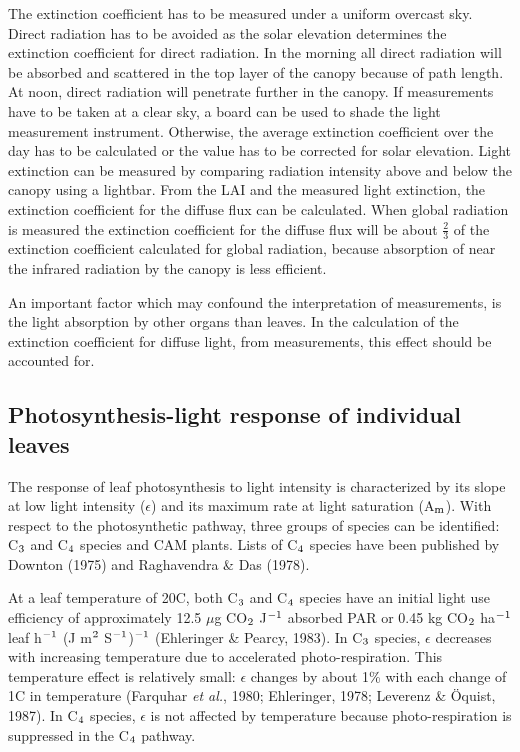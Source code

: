 The extinction coefficient has to be measured under a uniform overcast sky. Direct
radiation has to be avoided as the solar elevation determines the extinction coefficient for
direct radiation. In the morning all direct radiation will be absorbed and scattered in the
top layer of the canopy because of path length. At noon, direct radiation will penetrate
further in the canopy. If measurements have to be taken at a clear sky, a board can be
used to shade the light measurement instrument. Otherwise, the average extinction
coefficient over the day has to be calculated or the value has to be corrected for solar
elevation. Light extinction can be measured by comparing radiation intensity above and
below the canopy using a lightbar. From the LAI and the measured light extinction, the
extinction coefficient for the diffuse flux can be calculated. When global radiation is
measured the extinction coefficient for the diffuse flux will be about $\frac{2}{3}$ of the extinction
coefficient calculated for global radiation, because absorption of near the infrared
radiation by the canopy is less efficient.

An important factor which may confound the interpretation of measurements, is the light
absorption by other organs than leaves. In the calculation of the extinction coefficient for
diffuse light, from measurements, this effect should be accounted for.

\subsection{Photosynthesis-light response of individual leaves} 

The response of leaf photosynthesis to light intensity is characterized by its slope at low
light intensity ($\epsilon$) and its maximum rate at light saturation (A$_{{\rm m}}$). With respect to the
photosynthetic pathway, three groups of species can be identified: C$_{{\rm 3}}$ and C$_{{\rm 4}}$ species and
CAM plants. Lists of C$_{{\rm 4}}$ species have been published by Downton (1975) and
Raghavendra \& Das (1978).   

At a leaf temperature of 20\degrees C, both C$_{{\rm 3}}$ and C$_{{\rm 4}}$ species have an initial 
light use efficiency of approximately 12.5 $\mu$g CO$_{{\rm 2}}$ J$^{{\rm -1}}$ absorbed PAR or 0.45 kg 
CO$_{{\rm 2}}$ ha$^{{\rm -}{1}}$ leaf h$^{{\rm -}{1}}$ (J m$^{{\rm 2}}$ S$^{{\rm -}{1}}$)$^{{\rm -}{1}}$
(Ehleringer \& Pearcy, 1983). In C$_{{\rm 3}}$ species, $\epsilon$ decreases with increasing temperature due
to accelerated photo-respiration. This temperature effect is relatively small: $\epsilon$ changes by
about 1\% with each change of 1\degrees C in temperature (Farquhar {\it et al.}, 1980; Ehleringer,
1978; Leverenz \& \"{O}quist, 1987). In C$_{{\rm 4}}$ species, $\epsilon$ is not affected by temperature because
photo-respiration is suppressed in the C$_{{\rm 4}}$ pathway. 

